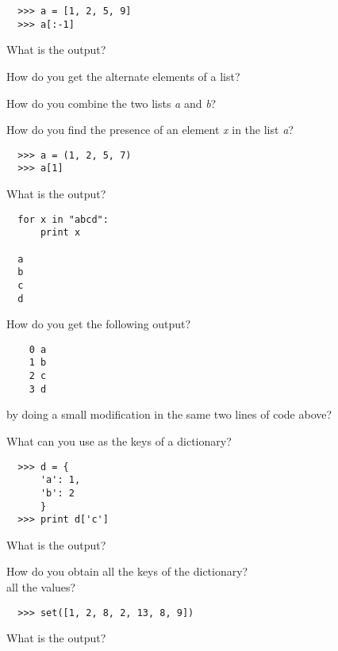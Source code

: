 \documentclass[14pt,compress]{beamer}
\begin{document}
\begin{frame}[fragile]{}
  \begin{lstlisting}
  >>> a = [1, 2, 5, 9]
  >>> a[:-1]
  \end{lstlisting}
  What is the output?
\end{frame}

\begin{frame}{}
  How do you get the alternate elements of a list?
\end{frame}

\begin{frame}{}
  How do you combine the two lists \emph{a} and \emph{b}?
\end{frame}

\begin{frame}{}
  How do you find the presence of an element \emph{x} in the list \emph{a}?
\end{frame}

\begin{frame}[fragile]{}
  \begin{lstlisting}
  >>> a = (1, 2, 5, 7)
  >>> a[1]
  \end{lstlisting}
  What is the output?
\end{frame}

\begin{frame}[fragile]{}
  \begin{lstlisting}
  for x in "abcd":
      print x

  a
  b
  c
  d
  \end{lstlisting}
  How do you get the following output? 
  \begin{lstlisting}
    0 a
    1 b
    2 c
    3 d
  \end{lstlisting}
  by doing a small modification in the same two lines of code above?
\end{frame}

\begin{frame}{}
  What can you use as the keys of a dictionary?
\end{frame}

\begin{frame}[fragile]{}
  \begin{lstlisting}
  >>> d = {
      'a': 1,
      'b': 2
      }
  >>> print d['c']
  \end{lstlisting}
  What is the output?
\end{frame}

\begin{frame}{}
  How do you obtain all the keys of the dictionary?
  \pause
  \\all the values?
\end{frame}

\begin{frame}[fragile]{}
  \begin{lstlisting}
  >>> set([1, 2, 8, 2, 13, 8, 9])
  \end{lstlisting}
  What is the output?
\end{frame}
\end{document}
